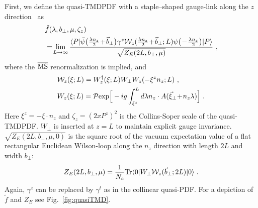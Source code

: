 First, we define the quasi-TMDPDF with a staple–shaped gauge-link along the $z$ direction~\cite{Ji:2014hxa,Ji:2018hvs,Ebert:2019okf,Ji:2019ewn} as
\begin{align}\label{eq:quasi_TMD}
	& \tilde f(\lambda ,b_\perp,\mu,\zeta_z) \\
	&=\! \lim_{L \rightarrow \infty}  \frac{\langle P| \bar \psi\big(\frac{\lambda n_z }{2}\!+\!\vec{b}_\perp\big)\gamma^z{\cal W}_{z}(\frac{\lambda n_z}{2}\!+\!\vec{b}_\perp;L)\psi\big(\!-\!\frac{\lambda n_z}{2}\big) |P\rangle}{\sqrt{Z_E(2L,b_\perp,\mu)}} \ , \nonumber
\end{align}
where the ${\overline{\rm MS}}$ renormalization is implied, and
\begin{align}\label{eq:staplez}
	&{\cal W}_z(\xi;L)=W^{\dagger}_{z}(\xi; L)W_{\perp}W_{z}(-\xi^zn_z;L)  \ ,\\
	&W_{z}(\xi;L)= {\cal P}{\rm exp}\Big[-ig\int_{\xi^z}^{L} d\lambda n_z\cdot A(\vec{\xi}_\perp\!+\!n_z \lambda)\Big] \ .
\end{align}
Here $\xi^z=-\xi\cdot n_z$ and $\zeta_z=(2xP^z)^2$ is the Collins-Soper scale of the quasi-TMDPDF. $W_{\perp}$ is inserted at $z=L$ to maintain explicit gauge invariance. $\sqrt{Z_E(2L,b_\perp,\mu,0)}$ is the square root of the vacuum expectation value of a flat rectangular Euclidean Wilson-loop along the $n_z$ direction with length $2L$ and width $b_\perp$:
\begin{align}\label{eq:Z_E}
	Z_E(2L,b_\perp,\mu)=\frac{1}{N_c}{\rm Tr}\langle 0|W_{\perp}{\cal W}_z(\vec{b}_\perp;2L)|0\rangle \ .
\end{align}
Again, $\gamma^z$ can be replaced by $\gamma^t$ as in the collinear quasi-PDF.
For a depiction of $\tilde f$ and $Z_E$ see Fig.~\ref{fig:quasiTMD}.

